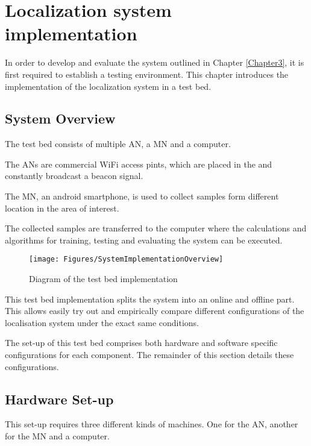 \chapter{Localization system implementation}

\label{Chapter4}

In order to develop and evaluate the system outlined in Chapter \ref{Chapter3}, it is first required to establish a testing environment.
This chapter introduces the  implementation of the localization system in a test bed.

\section{System Overview}

The test bed consists of multiple AN, a MN and a computer.

The ANs are commercial WiFi access pints, which are placed in the  and constantly broadcast a beacon signal.

The MN, an android smartphone, is used to collect samples form different location in the area of interest. 

The collected samples are transferred to the computer where the calculations and algorithms for training, testing and evaluating the system can be executed.

\begin{figure}[ht]
\centering
\texttt{[image: Figures/SystemImplementationOverview]}
\decoRule
\caption[localization system overview]{Diagram of the test bed implementation}
\label{fig:existingApproach}
\end{figure}

This test bed implementation splits the system into an online  and offline  part. This allows easily try out and empirically compare different configurations of the localisation system under the exact same conditions.

The set-up of this test bed comprises both hardware and software specific configurations for each component. The remainder of this section details these configurations.

\section{Hardware Set-up}

This set-up requires three different kinds of machines. One for the AN, another for the MN and a computer. 

